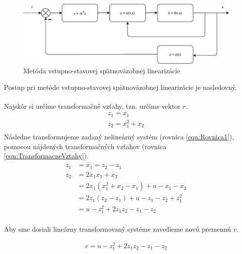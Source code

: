 \documentclass[../main.tex]{subfiles}
\begin{document}
\begin{figure}[H]
	\begin{center}\includegraphics[scale=0.8]{MVSlin.pdf}\end{center}
	\caption{Metóda vstupno-stavovej spätnoväzobnej linearizácie}
	\label{fig:MetodaVS}
\end{figure}

Postup pri metóde vstupno-stavovej spätnoväzobnej linearizácie je nasledovný.\\\\
Najskôr si určíme transformačné vzťahy, tzn. určíme vektor $r$.
\begin{equation}
	\begin{gathered}
		z_1  = x_1 \\
		z_2 = x_1^2 + x_2 \\
	\end{gathered}
	\label{eqn:TransformacneVztahy}
\end{equation}
Následne transformujeme zadaný nelineárný systém (rovnica \ref{eqn:Rovnica1}), pomocou nájdených transformačných vzťahov (rovnica \ref{eqn:TransformacneVztahy}).
\begin{equation}
	\begin{split}
	\dot{z_1}  & = \dot{x_1} = z_2 - z_1 \\
	\dot{z_2} & = 2x_1\dot{x_1} + \dot{x_2} \\
	 & = 2x_1(x_1^2 + x_2 - x_1) + u - x_1 - x_2 \\
	 & = 2z_1(z_2 - z_1) + u - z_1 - z_2 + z_1^2\\
	 & = u - z_1^2 + 2z_1z_2 - z_1 - z_2 \\
	\end{split}
	\label{eqn:TransformovanySystem}
\end{equation}

Aby sme dosiali lineárny transformovaný systéme zavedieme novú premennú $v$.

\begin{equation}
	\begin{split}
	 v = u - z_1^2 + 2z_1z_2 - z_1 - z_2 \\
	\end{split}
	\label{eqn:SubsV}
\end{equation}
\end{document}
